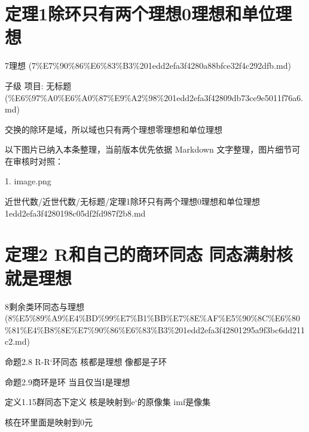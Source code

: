 \section*{定理1除环只有两个理想0理想和单位理想}

\begin{note}[来源上级主题]

7理想 (7\%E7\%90\%86\%E6\%83\%B3\%201edd2efa3f4280a88bfce32f4c292dfb.md)

\end{note}

\begin{theorem}

子级 项目: 无标题 (\%E6\%97\%A0\%E6\%A0\%87\%E9\%A2\%98\%201edd2efa3f42809db73ce9e5011f76a6.md)

交换的除环是域，所以域也只有两个理想零理想和单位理想

\end{theorem}

\begin{note}[关联图片]
以下图片已纳入本条整理，当前版本优先依据 Markdown 文字整理，图片细节可在审核时对照：

1. image.png\\

\end{note}

\begin{note}[来源路径]

近世代数/近世代数/无标题/定理1除环只有两个理想0理想和单位理想 1edd2efa3f4280198c05df2fd987f2b8.md

\end{note}

\section*{定理2 R和自己的商环同态 同态满射核就是理想}

\begin{note}[来源上级主题]

8剩余类环同态与理想 (8\%E5\%89\%A9\%E4\%BD\%99\%E7\%B1\%BB\%E7\%8E\%AF\%E5\%90\%8C\%E6\%80\%81\%E4\%B8\%8E\%E7\%90\%86\%E6\%83\%B3\%201edd2efa3f42801295a9f3bc6dd211c2.md)

\end{note}

\begin{theorem}

命题2.8 R-R‘环同态 核都是理想 像都是子环

命题2.9商环是环 当且仅当I是理想

定义1.15群同态下定义 核是映射到e‘的原像集 imf是像集

核在环里面是映射到0元

\end{theorem}


